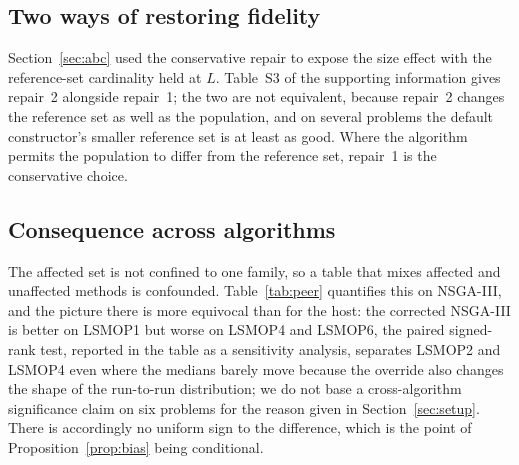 \documentclass{SCIS2026}
\begin{document}
\begin{table}[!t]
\centering
\footnotesize
\caption{Repair 1 against the published host, unpaired Mann--Whitney test with Holm--Bonferroni correction over the fifteen comparisons. The two same-size arms are not bit-identical (Section~\ref{sec:abc}), so the runs are treated as independent samples; the paired signed-rank and sign-test counterparts are in Table~S6. ``Repair 1 wins'' counts the runs on which the corrected host attains a smaller indicator}
\label{tab:sig}

\end{table}

\subsection{Two ways of restoring fidelity}
\label{sec:repairs}
Section~\ref{sec:abc} used the conservative repair to expose the size effect with the reference-set cardinality held at $L$. Table~S3 of the supporting information gives repair~2 alongside repair~1; the two are not equivalent, because repair~2 changes the reference set as well as the population, and on several problems the default constructor's smaller reference set is at least as good. Where the algorithm permits the population to differ from the reference set, repair~1 is the conservative choice.

\subsection{Consequence across algorithms}
\label{sec:across}
The affected set is not confined to one family, so a table that mixes affected and unaffected methods is confounded. Table~\ref{tab:peer} quantifies this on NSGA-III, and the picture there is more equivocal than for the host: the corrected NSGA-III is better on LSMOP1 but worse on LSMOP4 and LSMOP6, the paired signed-rank test, reported in the table as a sensitivity analysis, separates LSMOP2 and LSMOP4 even where the medians barely move because the override also changes the shape of the run-to-run distribution; we do not base a cross-algorithm significance claim on six problems for the reason given in Section~\ref{sec:setup}. There is accordingly no uniform sign to the difference, which is the point of Proposition~\ref{prop:bias} being conditional.
\end{document}
